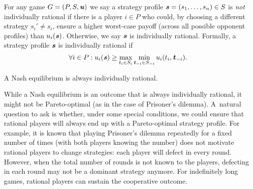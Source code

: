 \begin{definition}
  For any game $G = (P, S, \boldsymbol{\mathit{u}})$ we say a strategy profile $\boldsymbol{\mathit{s}} = (s_1, \dots, s_n) \in S$ is \textit{not} individually rational if there is a player $i \in P$ who could, by choosing a different strategy $s_i' \ne s_i$, ensure a higher worst-case payoff (across all possible opponent profiles) than $u_i(\boldsymbol{\mathit{s}})$.
  Otherwise, we say $\boldsymbol{\mathit{s}}$ is individually rational.
  Formally, a strategy profile $\boldsymbol{\mathit{s}}$ is individually rational if
  \[
    \forall i \in P: u_i(\boldsymbol{\mathit{s}}) \ge \max_{t_i\in S_i}\min_{\boldsymbol{\mathit{t}}_{-i} \in S_{-i}}u_i(t_i, \boldsymbol{\mathit{t}}_{-i}).
  \]
\end{definition}

\begin{observation}
  A Nash equilibrium is always individually rational.
\end{observation}

While a Nash equilibrium is an outcome that is always individually rational, it might not be Pareto-optimal (as in the case of Prisoner's dilemma).
A~natural question to ask is whether, under some special conditions, we could ensure that rational players will always end up with a Pareto-optimal strategy profile.
For example, it is known that playing Prisoner's dilemma repeatedly for a fixed number of times (with both players knowing the number) does not motivate rational players to change strategies: each player will defect in every round.
However, when the total number of rounds is not known to the players, defecting in each round may not be a dominant strategy anymore.
For indefinitely long games, rational players can sustain the cooperative outcome.

